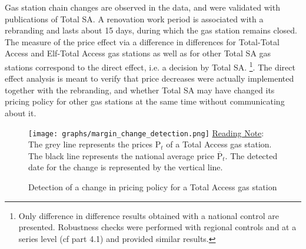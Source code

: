 \documentclass[english]{article}
\begin{document}
Gas station chain changes are observed in the data, and were validated with publications of Total SA. A renovation work period is associated with a rebranding and lasts about 15 days, during which the gas station remains closed. The measure of the price effect via a difference in differences for Total-Total Access and Elf-Total Access gas stations as well as for other Total SA gas stations correspond to the direct effect, i.e. a decision by Total SA.%
\footnote{Only difference in difference results obtained with a national control are presented. Robustness checks were performed with regional controls and at a series level (cf part 4.1) and provided similar results.%
}. The direct effect analysis is meant to verify that price decreases were actually implemented together with the rebranding, and whether Total SA may have changed its pricing policy for other gas stations at the same time without communicating about it.
\newpage{}

\begin{figure}[H]
    \caption{Detection of a change in pricing policy for a Total Access gas station}
		\label{fig:margin_change_detection}
\texttt{[image: graphs/margin\_change\_detection.png]}
\flushleft
{\small{}\uline{Reading Note}}{\small{}: } The grey line represents the prices $\mathrm{P}_{t}$ of a Total Access gas station. The black line represents the national average price $\overline{\mathrm{P}}_{t}$. The detected date for the change is represented by the vertical line.\medskip{}
\end{figure}
\end{document}
